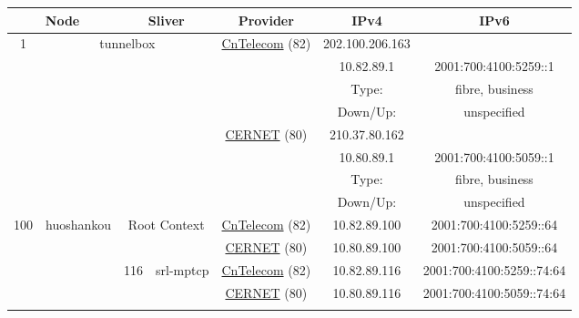 \begin{small}
\begin{center}
\begin{longtable}{|c|c|c|c|c|c|c|c|}
 \multicolumn{2}{|p{8em}|}{Node} & \multicolumn{2}{|p{8em}|}{Sliver} & \multicolumn{2}{|p{8em}|}{Provider} & IPv4 & IPv6 \\ \hline
\endhead
 \multirow{8}{*}{\tiny{1}} & \multicolumn{3}{|c|}{\multirow{8}{*}{\tiny{tunnelbox}}} & \multicolumn{2}{|c|}{\multirow{4}{*}{\tiny{\href{http://www.chinatelecom.com.cn}{CnTelecom} (82)}}} & \tiny{202.100.206.163} & \frownie{} \\* \cline{7-7}\cline{8-8}
  & \multicolumn{3}{|c|}{} & \multicolumn{2}{|c|}{} & \tiny{10.82.89.1} & \tiny{2001:700:4100:5259::1} \\* \cline{7-7}\cline{8-8}
  & \multicolumn{3}{|c|}{} & \multicolumn{2}{|c|}{} & Type: & fibre, business \\* \cline{7-7}\cline{8-8}
  & \multicolumn{3}{|c|}{} & \multicolumn{2}{|c|}{} & Down/Up:  & unspecified \\* \cline{5-5}\cline{6-6}\cline{7-7}\cline{8-8}
  & \multicolumn{3}{|c|}{} & \multicolumn{2}{|c|}{\multirow{4}{*}{\tiny{\href{http://www.cernet.edu.cn}{CERNET} (80)}}} & \tiny{210.37.80.162} & \frownie{} \\* \cline{7-7}\cline{8-8}
  & \multicolumn{3}{|c|}{} & \multicolumn{2}{|c|}{} & \tiny{10.80.89.1} & \tiny{2001:700:4100:5059::1} \\* \cline{7-7}\cline{8-8}
  & \multicolumn{3}{|c|}{} & \multicolumn{2}{|c|}{} & Type: & fibre, business \\* \cline{7-7}\cline{8-8}
  & \multicolumn{3}{|c|}{} & \multicolumn{2}{|c|}{} & Down/Up:  & unspecified \\ \hline
 \multirow{22}{*}{\tiny{100}} & \multicolumn{1}{|l|}{\multirow{22}{*}{\tiny{huoshankou}}} & \multicolumn{2}{|c|}{\multirow{2}{*}{\tiny{Root Context}}} & \multicolumn{2}{|c|}{\tiny{\href{http://www.chinatelecom.com.cn}{CnTelecom} (82)}} & \tiny{10.82.89.100} & \tiny{2001:700:4100:5259::64} \\* \cline{5-5}\cline{6-6}\cline{7-7}\cline{8-8}
  &  & \multicolumn{2}{|c|}{} & \multicolumn{2}{|c|}{\tiny{\href{http://www.cernet.edu.cn}{CERNET} (80)}} & \tiny{10.80.89.100} & \tiny{2001:700:4100:5059::64} \\* \cline{3-3}\cline{4-4}\cline{5-5}\cline{6-6}\cline{7-7}\cline{8-8}
  &  & \multirow{2}{*}{\tiny{116}} & \multicolumn{1}{|l|}{\multirow{2}{*}{\tiny{srl-mptcp}}} & \multicolumn{2}{|c|}{\tiny{\href{http://www.chinatelecom.com.cn}{CnTelecom} (82)}} & \tiny{10.82.89.116} & \tiny{2001:700:4100:5259::74:64} \\* \cline{5-5}\cline{6-6}\cline{7-7}\cline{8-8}
  &  &  &  & \multicolumn{2}{|c|}{\tiny{\href{http://www.cernet.edu.cn}{CERNET} (80)}} & \tiny{10.80.89.116} & \tiny{2001:700:4100:5059::74:64} \\* \cline{3-3}\cline{4-4}\cline{5-5}\cline{6-6}\cline{7-7}\cline{8-8}

\end{longtable}
\end{center}
\end{small}
